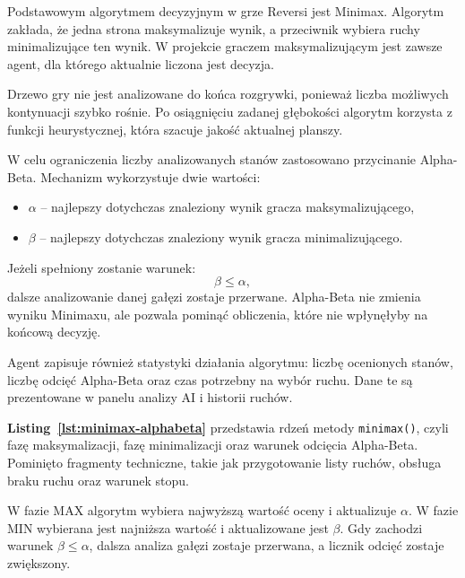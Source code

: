 Podstawowym algorytmem decyzyjnym w grze Reversi jest Minimax. Algorytm zakłada, że jedna strona maksymalizuje wynik, a przeciwnik wybiera ruchy minimalizujące ten wynik. W projekcie graczem maksymalizującym jest zawsze agent, dla którego aktualnie liczona jest decyzja.

Drzewo gry nie jest analizowane do końca rozgrywki, ponieważ liczba możliwych kontynuacji szybko rośnie. Po osiągnięciu zadanej głębokości algorytm korzysta z funkcji heurystycznej, która szacuje jakość aktualnej planszy.

W celu ograniczenia liczby analizowanych stanów zastosowano przycinanie Alpha-Beta. Mechanizm wykorzystuje dwie wartości:
\begin{itemize}
\item $\alpha$ -- najlepszy dotychczas znaleziony wynik gracza maksymalizującego,
\item $\beta$ -- najlepszy dotychczas znaleziony wynik gracza minimalizującego.
\end{itemize}

Jeżeli spełniony zostanie warunek:
\begin{equation*}
\beta \leq \alpha,
\end{equation*}
dalsze analizowanie danej gałęzi zostaje przerwane. Alpha-Beta nie zmienia wyniku Minimaxu, ale pozwala pominąć obliczenia, które nie wpłynęłyby na końcową decyzję.

Agent zapisuje również statystyki działania algorytmu: liczbę ocenionych stanów, liczbę odcięć Alpha-Beta oraz czas potrzebny na wybór ruchu. Dane te są prezentowane w panelu analizy AI i historii ruchów.

\newpage



\textbf{Listing~\ref{lst:minimax-alphabeta}} przedstawia rdzeń metody \texttt{minimax()}, czyli fazę maksymalizacji, fazę minimalizacji oraz warunek odcięcia Alpha-Beta. Pominięto fragmenty techniczne, takie jak przygotowanie listy ruchów, obsługa braku ruchu oraz warunek stopu.

W fazie MAX algorytm wybiera najwyższą wartość oceny i aktualizuje $\alpha$. W fazie MIN wybierana jest najniższa wartość i aktualizowane jest $\beta$. Gdy zachodzi warunek $\beta \leq \alpha$, dalsza analiza gałęzi zostaje przerwana, a licznik odcięć zostaje zwiększony.

